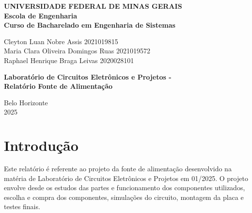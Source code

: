 \documentclass[
	12pt,				%
	oneside,			%
	a4paper,			%
	chapter=TITLE,
	sumario=tradicional,
	english,			%
	brazil				%
]{abntex2}
\begin{document}

\frenchspacing 

\begin{center}
\textbf{UNIVERSIDADE FEDERAL DE MINAS GERAIS\\
Escola de Engenharia \\
Curso de Bacharelado em Engenharia de Sistemas}

\vspace{4cm}

Cleyton Luan Nobre Assis 2021019815 \\
Maria Clara Oliveira Domingos Ruas 2021019572 \\
Raphael Henrique Braga Leivas 2020028101

\vspace{4cm}  

{ \textbf{Laboratório de Circuitos Eletrônicos e Projetos - \\ Relatório Fonte de Alimentação} }

\vfill
{Belo Horizonte \\
2025 }
\end{center}

\newpage

\tableofcontents*
\cleardoublepage

\textual

\pagestyle{simple}

\chapter{Introdução}\label{cap:introdução} 

Este relatório é referente ao projeto da fonte de alimentação desenvolvido na matéria de Laboratório de Circuitos Eletrônicos e Projetos em 01/2025. O projeto envolve desde os estudos das partes e funcionamento dos componentes utilizados, escolha e compra dos componentes, simulações do circuito, montagem da placa e testes finais.
\end{document}

